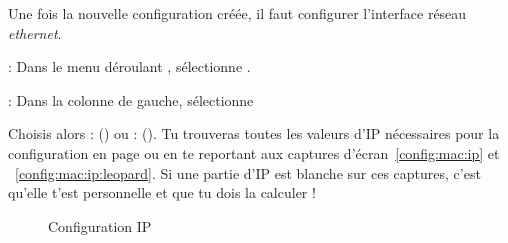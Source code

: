 

Une fois la nouvelle configuration créée, il faut configurer l'interface réseau \emph{ethernet}.

 : Dans le menu déroulant , sélectionne
.


 : Dans la colonne de gauche, sélectionne 

Choisis alors  :  () ou  :  (). Tu trouveras toutes les valeurs d'IP nécessaires pour la configuration en page \pageref{calcul_ip} ou en te reportant aux captures d'écran~\ref{config:mac:ip} et ~\ref{config:mac:ip:leopard}. Si une partie d'IP est blanche sur ces captures, c'est qu'elle t'est personnelle et que tu dois la calculer !

  \begin{figure}[!hl]
    \begin{center}
      \hfill
      \caption{Configuration IP}
    \end{center}
  \end{figure}
  
